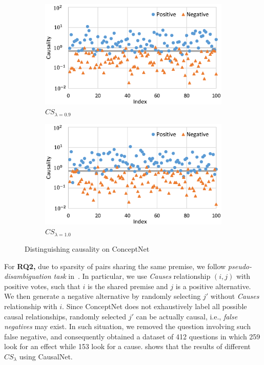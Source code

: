 \begin{figure}[ht!]
\centering
\begin{subfigure}[t]{0.9\columnwidth}
\centering
\includegraphics[width=0.9\columnwidth]{rq1-a}
\caption{$CS_{\lambda=0.9}$}
\end{subfigure}
\begin{subfigure}[t]{0.9\columnwidth}
\centering
\includegraphics[width=0.9\columnwidth]{rq1-b}
\caption{$CS_{\lambda=1.0}$}
\end{subfigure}
\caption{Distinguishing causality on ConceptNet}
\label{fig:conceptApp1}
\end{figure}

For {\bf RQ2,}
due to sparsity of pairs sharing the same premise,
we follow \emph{pseudo-disambiguation task} in~\cite{Erk}.
In particular, we use \emph{Causes} relationship $(i,j)$ with
positive votes, such that $i$ is the shared premise and $j$ is a
positive alternative. We then generate a negative alternative by
randomly selecting $j'$ without \emph{Causes} relationship with $i$.
Since ConceptNet does not exhaustively
label all possible causal relationships, randomly selected $j'$ can
be actually causal, i.e., \emph{false negatives} may exist. In such
situation, we removed the question involving such false negative,
and consequently obtained a dataset of 412 questions in which 259
look for an effect while 153 look for a cause. 
shows that the results of different $CS_\lambda$
using CausalNet.

